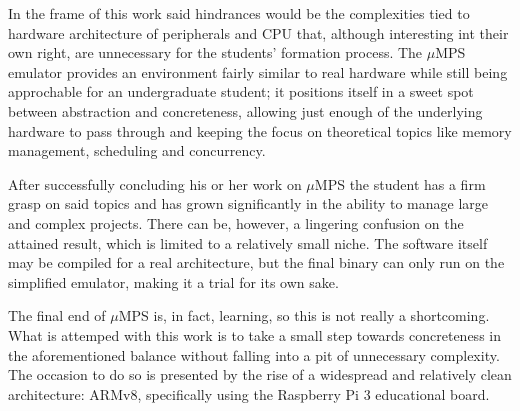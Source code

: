 \documentclass[12pt,a4paper,openright,twoside]{report}
\begin{document}
In the frame of this work said hindrances would be the complexities tied to
hardware architecture of peripherals and CPU that, although interesting
int their own right, are unnecessary for the students' formation process.
The $\mu$MPS emulator provides an environment fairly similar to real hardware
while still being approchable for an undergraduate student; it positions itself
in a sweet spot between abstraction and concreteness, allowing just enough
of the underlying hardware to pass through and keeping the focus on 
theoretical topics like memory management, scheduling and concurrency.

After successfully concluding his or her work on $\mu$MPS the student has
a firm grasp on said topics and has grown significantly in the ability to
manage large and complex projects. There can be, however, a lingering confusion
on the attained result, which is limited to a relatively small niche.
The software itself may be compiled for a real architecture, but the final binary
can only run on the simplified emulator, making it a trial for its own sake.

The final end of $\mu$MPS is, in fact, learning, so this is not really a shortcoming.
What is attemped with this work is to take a small step towards concreteness in 
the aforementioned balance without falling into a pit of unnecessary complexity.
The occasion to do so is presented by the rise of a widespread and relatively
clean architecture: ARMv8, specifically using the Raspberry Pi 3 educational board.
\end{document}
